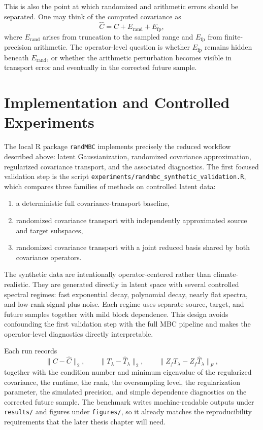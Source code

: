\documentclass[12pt,a4paper]{article}
\begin{document}
This is also the point at which randomized and arithmetic errors should be separated. One may think of the computed covariance as
\[
	\widehat C = C + E_{\mathrm{rand}} + E_{\mathrm{fp}},
\]
where $E_{\mathrm{rand}}$ arises from truncation to the sampled range and $E_{\mathrm{fp}}$ from finite-precision arithmetic. The operator-level question is whether $E_{\mathrm{fp}}$ remains hidden beneath $E_{\mathrm{rand}}$, or whether the arithmetic perturbation becomes visible in transport error and eventually in the corrected future sample.

\section{Implementation and Controlled Experiments}

The local R package \texttt{randMBC} implements precisely the reduced workflow described above: latent Gaussianization, randomized covariance approximation, regularized covariance transport, and the associated diagnostics. The first focused validation step is the script
\texttt{experiments/randmbc\_synthetic\_validation.R}, which compares three
families of methods on controlled latent data:
\begin{enumerate}
	\item a deterministic full covariance-transport baseline,
	\item randomized covariance transport with independently approximated source and target subspaces,
	\item randomized covariance transport with a joint reduced basis shared by both covariance operators.
\end{enumerate}

The synthetic data are intentionally operator-centered rather than climate-realistic. They are generated directly in latent space with several controlled spectral regimes: fast exponential decay, polynomial decay, nearly flat spectra, and low-rank signal plus noise. Each regime uses separate source, target, and future samples together with mild block dependence. This design avoids confounding the first validation step with the full MBC pipeline and makes the operator-level diagnostics directly interpretable.

Each run records
\[
	\|C - \widehat C\|_2,
	\qquad
	\|T_\lambda - \widehat T_\lambda\|_2,
	\qquad
	\|Z_fT_\lambda - Z_f\widehat T_\lambda\|_F,
\]
together with the condition number and minimum eigenvalue of the regularized covariance, the runtime, the rank, the oversampling level, the regularization parameter, the simulated precision, and simple dependence diagnostics on the corrected future sample. The benchmark writes machine-readable outputs under \texttt{results/} and figures under \texttt{figures/}, so it already matches the reproducibility requirements that the later thesis chapter will need.
\end{document}
